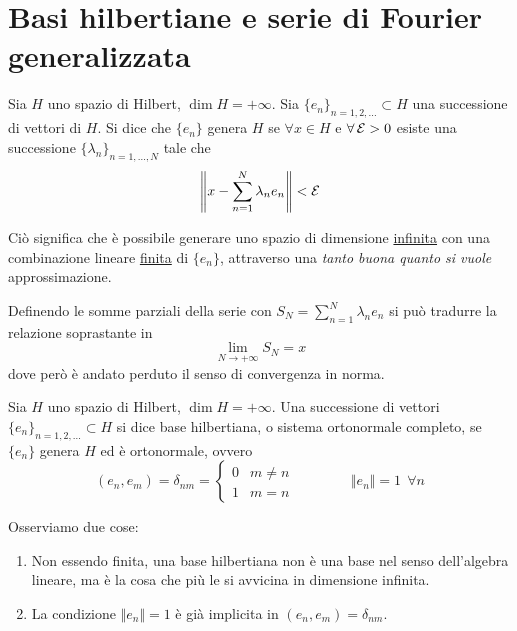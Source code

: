 \newpage


\section{Basi hilbertiane e serie di Fourier generalizzata}

\begin{defn}
Sia $H$ uno spazio di Hilbert, $\dim H=+\infty$. Sia $\{e_n\}_{n=1,2,\dots}\subset H$ una successione di vettori di $H$. Si dice che $\{e_n\}$ genera $H$ se $\forall x\in H$ e $\forall\Ec>0$ esiste una successione $\{\lambda_n\}_{n=1,\dots,N}$ tale che
$$
\left\|x-\sum_{n=1}^N\lambda_ne_n \right\|<\mathcal{E}
$$
\end{defn}
Ciò significa che è possibile generare uno spazio di dimensione \underline{infinita} con una combinazione lineare \underline{finita} di $\{e_n\}$, attraverso una \textit{tanto buona quanto si vuole} approssimazione.

\begin{rem}
Definendo le somme parziali della serie con $S_N=\sum_{n=1}^N\lambda_ne_n$ si può tradurre la relazione soprastante in 
$$
\lim_{N\to+\infty}S_N=x
$$
dove però è andato perduto il senso di convergenza in norma.
\end{rem}

\begin{defn}
Sia $H$ uno spazio di Hilbert, $\dim H=+\infty$. Una successione di vettori $\{e_n\}_{n=1,2,\dots}\subset H$ si dice base hilbertiana, o sistema ortonormale completo, se $\{e_n\}$ genera $H$ ed è ortonormale, ovvero
$$
(e_n,e_m)=\delta_{nm}=
\begin{cases}
0 &m\neq n \\ 1 &m=n
\end{cases} \qquad \qquad \Vert e_n \Vert =1\ \ \forall n
$$
\end{defn}

Osserviamo due cose:
\begin{enumerate}
    \item Non essendo finita, una base hilbertiana non è una base nel senso dell'algebra lineare, ma è la cosa che più le si avvicina in dimensione infinita.
    \item La condizione $\Vert e_n \Vert =1$ è già implicita in $(e_n,e_m)=\delta_{nm}$.
\end{enumerate}

